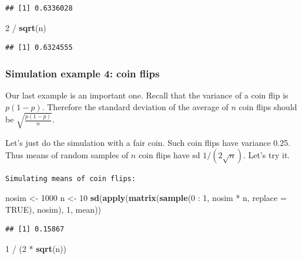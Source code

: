 \documentclass[]{article}
\newenvironment{Shaded}{\begin{snugshade}}{\end{snugshade}}
\newcommand{\KeywordTok}[1]{\textcolor[rgb]{0.13,0.29,0.53}{\textbf{{#1}}}}
\newcommand{\DataTypeTok}[1]{\textcolor[rgb]{0.13,0.29,0.53}{{#1}}}
\newcommand{\DecValTok}[1]{\textcolor[rgb]{0.00,0.00,0.81}{{#1}}}
\newcommand{\StringTok}[1]{\textcolor[rgb]{0.31,0.60,0.02}{{#1}}}
\newcommand{\OtherTok}[1]{\textcolor[rgb]{0.56,0.35,0.01}{{#1}}}
\newcommand{\NormalTok}[1]{{#1}}
\begin{document}
\begin{verbatim}
## [1] 0.6336028
\end{verbatim}

\begin{Shaded}
\begin{Highlighting}[]
\DecValTok{2} \NormalTok{/}\StringTok{ }\KeywordTok{sqrt}\NormalTok{(n)}
\end{Highlighting}
\end{Shaded}

\begin{verbatim}
## [1] 0.6324555
\end{verbatim}

\subsubsection{Simulation example 4: coin
flips}\label{simulation-example-4-coin-flips}

Our last example is an important one. Recall that the variance of a coin
flip is $p (1 - p)$. Therefore the standard deviation of the average of
$n$ coin flips should be $\sqrt{\frac{p(1-p)}{n}}$.

Let's just do the simulation with a fair coin. Such coin flips have
variance 0.25. Thus means of random samples of $n$ coin flips have sd
$1 / (2 \sqrt{n})$. Let's try it.

\vspace{1pc}

\verb;Simulating means of coin flips:;

\begin{Shaded}
\begin{Highlighting}[]
\NormalTok{nosim <-}\StringTok{ }\DecValTok{1000}
\NormalTok{n <-}\StringTok{ }\DecValTok{10}
\KeywordTok{sd}\NormalTok{(}\KeywordTok{apply}\NormalTok{(}\KeywordTok{matrix}\NormalTok{(}\KeywordTok{sample}\NormalTok{(}\DecValTok{0} \NormalTok{:}\StringTok{ }\DecValTok{1}\NormalTok{, nosim *}\StringTok{ }\NormalTok{n, }\DataTypeTok{replace =} \OtherTok{TRUE}\NormalTok{),}
                \NormalTok{nosim), }\DecValTok{1}\NormalTok{, mean))}
\end{Highlighting}
\end{Shaded}

\begin{verbatim}
## [1] 0.15867
\end{verbatim}

\begin{Shaded}
\begin{Highlighting}[]
\DecValTok{1} \NormalTok{/}\StringTok{ }\NormalTok{(}\DecValTok{2} \NormalTok{*}\StringTok{ }\KeywordTok{sqrt}\NormalTok{(n))}
\end{Highlighting}
\end{Shaded}
\end{document}
